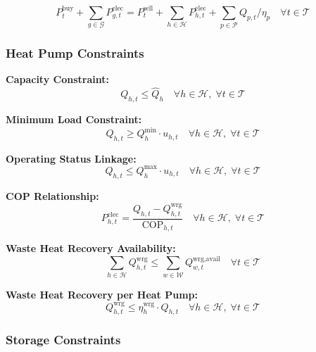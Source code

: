 \documentclass[11pt]{article}
\begin{document}
\begin{equation}
P_t^{\text{buy}} + \sum_{g \in \mathcal{G}} P_{g,t}^{\text{elec}} = P_t^{\text{sell}} + \sum_{h \in \mathcal{H}} P_{h,t}^{\text{elec}} + \sum_{p \in \mathcal{P}} Q_{p,t} / \eta_p \quad \forall t \in \mathcal{T}
\label{eq:elec_balance}
\end{equation}

\subsubsection{Heat Pump Constraints}

\textbf{Capacity Constraint:}
\begin{equation}
Q_{h,t} \leq \hat{Q}_h \quad \forall h \in \mathcal{H}, \; \forall t \in \mathcal{T}
\label{eq:hp_cap}
\end{equation}

\textbf{Minimum Load Constraint:}
\begin{equation}
Q_{h,t} \geq Q_h^{\text{min}} \cdot u_{h,t} \quad \forall h \in \mathcal{H}, \; \forall t \in \mathcal{T}
\label{eq:hp_minload}
\end{equation}

\textbf{Operating Status Linkage:}
\begin{equation}
Q_{h,t} \leq Q_h^{\text{max}} \cdot u_{h,t} \quad \forall h \in \mathcal{H}, \; \forall t \in \mathcal{T}
\label{eq:hp_on_off}
\end{equation}

\textbf{COP Relationship:}
\begin{equation}
P_{h,t}^{\text{elec}} = \frac{Q_{h,t} - Q_{h,t}^{\text{wrg}}}{\text{COP}_{h,t}} \quad \forall h \in \mathcal{H}, \; \forall t \in \mathcal{T}
\label{eq:hp_cop}
\end{equation}

\textbf{Waste Heat Recovery Availability:}
\begin{equation}
\sum_{h \in \mathcal{H}} Q_{h,t}^{\text{wrg}} \leq \sum_{w \in \mathcal{W}} Q_{w,t}^{\text{wrg,avail}} \quad \forall t \in \mathcal{T}
\label{eq:wrg_avail}
\end{equation}

\textbf{Waste Heat Recovery per Heat Pump:}
\begin{equation}
Q_{h,t}^{\text{wrg}} \leq \eta_h^{\text{wrg}} \cdot Q_{h,t} \quad \forall h \in \mathcal{H}, \; \forall t \in \mathcal{T}
\label{eq:wrg_hp}
\end{equation}

\subsubsection{Storage Constraints}
\end{document}
